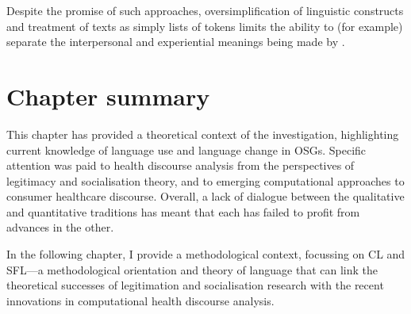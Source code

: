 Despite the promise of such approaches, oversimplification of linguistic constructs and treatment of texts as simply lists of tokens limits the ability to (for example) separate the interpersonal and experiential meanings being made by .

\section{Chapter summary}

This chapter has provided a theoretical context of the investigation, highlighting current knowledge of language use and language change in \glspl{OSG}. Specific attention was paid to health discourse analysis from the perspectives of legitimacy and socialisation theory, and to emerging computational approaches to consumer healthcare discourse. Overall, a lack of dialogue between the qualitative and quantitative traditions has meant that each has failed to profit from advances in the other.

In the following chapter, I provide a methodological context, focussing on \gls{CL} and \gls{SFL}---a methodological orientation and theory of language that can link the theoretical successes of legitimation and socialisation research with the recent innovations in computational health discourse analysis.

%















